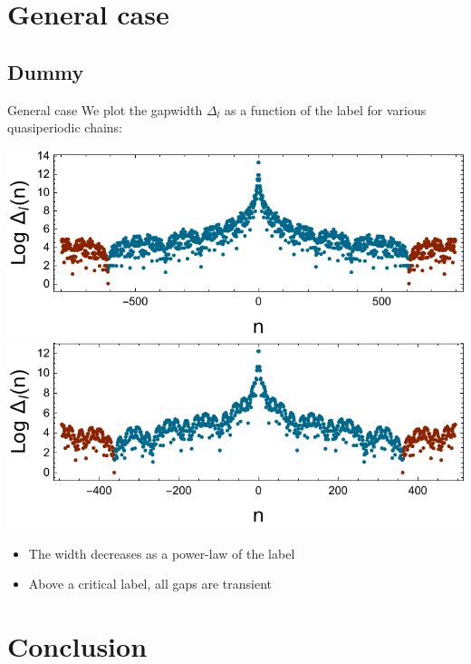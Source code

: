 \documentclass[xcolor=x11names,compress,professionalfonts]{beamer}
\renewcommand{\(}{\begin{columns}}
\renewcommand{\)}{\end{columns}}
\newcommand{\<}[1]{\begin{column}{#1}}
\renewcommand{\>}{\end{column}}
\begin{document}
\section{General case}
\subsection{Dummy}
\begin{frame}{General case}
We plot the gapwidth $\Delta_l$ as a function of the label for various quasiperiodic chains:

{\centering
\newcommand{\s}{.45}
\includegraphics[scale=\s]{img/loggapwidth_fibonacci_l_17.pdf}\\
\includegraphics[scale=\s]{img/loggapwidth_sqrt3_l_12.pdf}

}
\begin{itemize}
	\item The width decreases as a power-law of the label
	\item Above a critical label, all gaps are transient
\end{itemize}

	
\end{frame}

\section{Conclusion}
\end{document}
